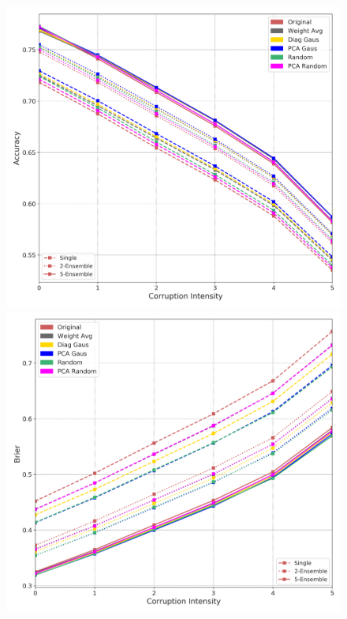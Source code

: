 \documentclass{article}
\newlength{\sfigwidth}
\newlength{\sfigwidththree}
\newlength{\sfigwidththreesubfigure}
\begin{document}
\begin{figure}[th]%
    \centering%
 \includegraphics[width=\sfigwidththreesubfigure]{figures/med_cnn_cifar_c_accuracy.png}%
       \includegraphics[width=\sfigwidththreesubfigure]{figures/med_cnn_cifar_c_brier.png}%

\end{figure}
\end{document}
